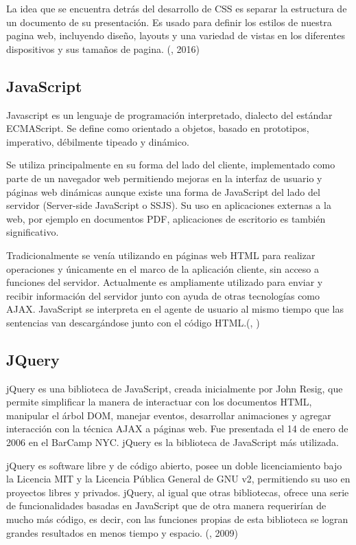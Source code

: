 La idea que se encuentra detrás del desarrollo de CSS es separar la estructura de un documento de su presentación. Es usado para definir los estilos de nuestra pagina web, incluyendo diseño, layouts y una variedad de vistas en los diferentes dispositivos y sus tamaños de pagina. (\citet{cssbib}, 2016)
\setlength{\parskip}{0mm}

\subsection{JavaScript}
\setlength{\parskip}{5mm}
Javascript es un lenguaje de programación interpretado, dialecto del estándar ECMAScript. Se define como orientado a objetos, basado en prototipos, imperativo, débilmente tipeado y dinámico.

Se utiliza principalmente en su forma del lado del cliente, implementado como parte de un navegador web permitiendo mejoras en la interfaz de usuario y páginas web dinámicas aunque existe una forma de JavaScript del lado del servidor (Server-side JavaScript o SSJS). Su uso en aplicaciones externas a la web, por ejemplo en documentos PDF, aplicaciones de escritorio es también significativo.

Tradicionalmente se venía utilizando en páginas web HTML para realizar operaciones y únicamente en el marco de la aplicación cliente, sin acceso a funciones del servidor. Actualmente es ampliamente utilizado para enviar y recibir información del servidor junto con ayuda de otras tecnologías como AJAX. JavaScript se interpreta en el agente de usuario al mismo tiempo que las sentencias van descargándose junto con el código HTML.(\citeauthor{javascripbib}, \citeyear{javascripbib})
\setlength{\parskip}{0mm}


\subsection{JQuery}
\setlength{\parskip}{5mm}
jQuery es una biblioteca de JavaScript, creada inicialmente por John Resig, que permite simplificar la manera de interactuar con los documentos HTML, manipular el árbol DOM, manejar eventos, desarrollar animaciones y agregar interacción con la técnica AJAX a páginas web. Fue presentada el 14 de enero de 2006 en el BarCamp NYC. jQuery es la biblioteca de JavaScript más utilizada.

jQuery es software libre y de código abierto, posee un doble licenciamiento bajo la Licencia MIT y la Licencia Pública General de GNU v2, permitiendo su uso en proyectos libres y privados. jQuery, al igual que otras bibliotecas, ofrece una serie de funcionalidades basadas en JavaScript que de otra manera requerirían de mucho más código, es decir, con las funciones propias de esta biblioteca se logran grandes resultados en menos tiempo y espacio.
\setlength{\parskip}{0mm}
(\citet{jquerybib}, 2009)

